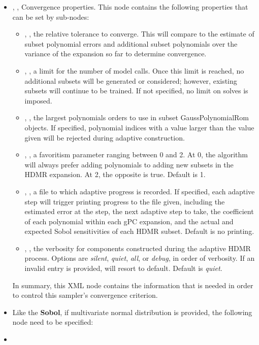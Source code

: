 \begin{itemize}
  \item {}, , Convergence
    properties.
    This node contains the following properties that can be set by sub-nodes:
    \begin{itemize}
      \item {}, , the relative tolerance to converge.
        This will compare to the estimate of subset polynomial errors and additional subset polynomials over
        the variance of the expansion so far to determine convergence.
      \item {}, ,
        a limit for the number of model calls.  Once this limit is reached, no additional subsets
        will be generated or considered; however, existing subsets will continue to be trained.  If not
        specified, no limit on solves is imposed.
      \item {}, ,
        the largest polynomials orders to use in subset GaussPolynomialRom objects.  If specified, polynomial
        indices with a value larger than the value given will be rejected during adaptive construction.
      \item {}, , a favoritism parameter ranging between
        0 and 2.  At 0, the algorithm will always prefer adding polynomials to adding new subsets in the HDMR
        expansion.  At 2, the opposite is true.  Default is 1.
      \item {}, ,
        a file to which adaptive progress is recorded.  If specified, each adaptive step will trigger printing
        progress to the file given, including the estimated error at the step, the next adaptive step to take,
        the coefficient of each polynomial within each gPC expansion, and the actual and expected Sobol
        sensitivities of each HDMR subset. Default is no printing.
      \item {}, , the verbosity for components
        constructed during the adaptive HDMR process.  Options are \emph{silent}, \emph{quiet}, \emph{all}, or
        \emph{debug}, in order of
        verbosity.  If an invalid entry is provided, will resort to default.  Default is \emph{quiet}.
    \end{itemize}
    In summary, this XML node contains the information that is needed in order
    to control this sampler's convergence criterion.
  \item \convergenceStudyDescription
  Like the \textbf{Sobol}, if multivariate normal distribution is provided, the following node need to be specified:
  \item {}

\end{itemize}
